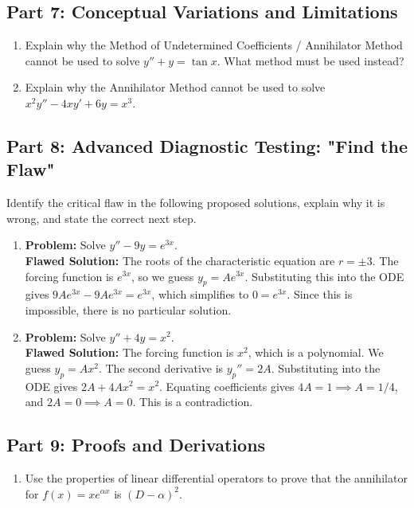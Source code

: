 \documentclass[11pt]{article}
\begin{document}
\subsection*{Part 7: Conceptual Variations and Limitations}
\begin{enumerate}[resume]
    \item Explain why the Method of Undetermined Coefficients / Annihilator Method cannot be used to solve $y'' + y = \tan x$. What method must be used instead?
    \item Explain why the Annihilator Method cannot be used to solve $x^2 y'' - 4x y' + 6y = x^3$.
\end{enumerate}

\subsection*{Part 8: Advanced Diagnostic Testing: "Find the Flaw"}
Identify the critical flaw in the following proposed solutions, explain why it is wrong, and state the correct next step.
\begin{enumerate}[resume]
    \item \textbf{Problem:} Solve $y'' - 9y = e^{3x}$. \\
    \textbf{Flawed Solution:} The roots of the characteristic equation are $r = \pm 3$. The forcing function is $e^{3x}$, so we guess $y_p = A e^{3x}$. Substituting this into the ODE gives $9A e^{3x} - 9A e^{3x} = e^{3x}$, which simplifies to $0 = e^{3x}$. Since this is impossible, there is no particular solution.
    \item \textbf{Problem:} Solve $y'' + 4y = x^2$. \\
    \textbf{Flawed Solution:} The forcing function is $x^2$, which is a polynomial. We guess $y_p = A x^2$. The second derivative is $y_p'' = 2A$. Substituting into the ODE gives $2A + 4A x^2 = x^2$. Equating coefficients gives $4A = 1 \implies A = 1/4$, and $2A = 0 \implies A = 0$. This is a contradiction.
\end{enumerate}

\subsection*{Part 9: Proofs and Derivations}
\begin{enumerate}[resume]
    \item Use the properties of linear differential operators to prove that the annihilator for $f(x) = x e^{\alpha x}$ is $(D - \alpha)^2$.
\end{enumerate}
\end{document}
